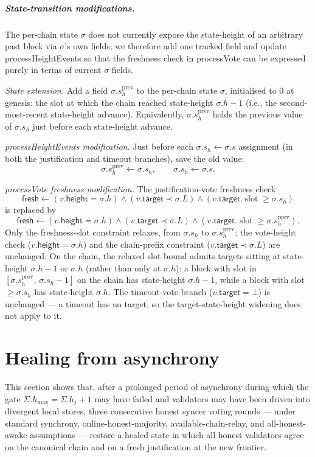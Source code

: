 \ifx\litemode\undefined\documentclass{article}\fi
\newcommand{\slot}[0]{\ensuremath{\operatorname{\mathrm{slot}}}}
\newcommand{\target}{\mathsf{target}}
\newcommand{\height}{\mathsf{height}}
\newcommand{\fresh}{\mathsf{fresh}}
\newcommand{\hmax}{\ensuremath{h_{\max}}\xspace}
\newcommand{\processHeightEvents}{\textsf{processHeightEvents}\xspace}
\newcommand{\processVote}{\textsf{processVote}\xspace}
\theoremstyle{plain}
\theoremstyle{definition}
\theoremstyle{remark}
\begin{document}
\subparagraph{State-transition modifications.}
The per-chain state $\sigma$ does not currently expose the state-height of an arbitrary past block via $\sigma$'s own fields; we therefore add one tracked field and update \processHeightEvents{} so that the freshness check in \processVote{} can be expressed purely in terms of current $\sigma$ fields.

\emph{State extension.}
Add a field $\sigma.s_h^{\mathrm{prev}}$ to the per-chain state $\sigma$, initialised to $0$ at genesis: the slot at which the chain reached state-height $\sigma.h - 1$ (i.e., the second-most-recent state-height advance).
Equivalently, $\sigma.s_h^{\mathrm{prev}}$ holds the previous value of $\sigma.s_h$ just before each state-height advance.

\emph{\processHeightEvents{} modification.}
Just before each $\sigma.s_h \gets \sigma.s$ assignment (in both the justification and timeout branches), save the old value:
\[
  \sigma.s_h^{\mathrm{prev}} \gets \sigma.s_h, \qquad \sigma.s_h \gets \sigma.s.
\]

\emph{\processVote{} freshness modification.}
The justification-vote freshness check
\[
  \fresh \gets (v.\height = \sigma.h) \land (v.\target \prec \sigma.L) \land (v.\target.\slot \geq \sigma.s_h)
\]
is replaced by
\[
  \fresh \gets (v.\height = \sigma.h) \land (v.\target \prec \sigma.L) \land (v.\target.\slot \geq \sigma.s_h^{\mathrm{prev}}).
\]
Only the freshness-slot constraint relaxes, from $\sigma.s_h$ to $\sigma.s_h^{\mathrm{prev}}$; the vote-height check ($v.\height = \sigma.h$) and the chain-prefix constraint ($v.\target \prec \sigma.L$) are unchanged.
On the chain, the relaxed slot bound admits targets sitting at state-height $\sigma.h - 1$ or $\sigma.h$ (rather than only at $\sigma.h$): a block with slot in $[\sigma.s_h^{\mathrm{prev}},\, \sigma.s_h - 1]$ on the chain has state-height $\sigma.h - 1$, while a block with slot $\geq \sigma.s_h$ has state-height $\sigma.h$.
The timeout-vote branch ($v.\target = \bot$) is unchanged --- a timeout has no target, so the target-state-height widening does not apply to it.
\fi

\section{Healing from asynchrony}\label{sec:healing}

This section shows that, after a prolonged period of asynchrony during which the gate $\Sigma.\hmax = \Sigma.h_j + 1$ may have failed and validators may have been driven into divergent local stores, three consecutive honest syncer voting rounds --- under standard synchrony, online-honest-majority, available-chain-relay, and all-honest-awake assumptions --- restore a healed state in which all honest validators agree on the canonical chain and on a fresh justification at the new frontier.
\end{document}
